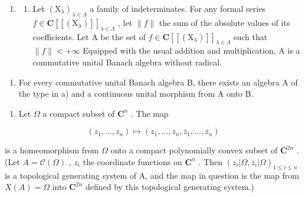 \begin{enumerate}
  Let \(\Delta\) the disk \(|z| \leqslant 1\) into \(\mathbf{C}\) the set of \(f \in \mathcal{C}(\Delta)\) that are holomorphic in the interior of \(\Delta\) and \(\mathrm{A}_1\) the Banach subalgebra of \(\mathcal{C}(\Delta)\) generated by A and by the function \(z \mapsto |z|\) . Show that \(\mathrm{X}(\mathrm{A}_1)\) is homeomorphic to the set of \((x_{1}, x_{2}, x_{3}) \in \mathbf{R}^{3}\) such that \(x_{1}^{2} + x_{2}^{2} \leqslant x_{3}^{2}\) and \(0 \leqslant x_{3} \leqslant 1\) .
\item
  \begin{enumerate}
  \def\labelenumii{\alph{enumii})}
  \tightlist
  \item
    Let \((\mathrm{X}_{\lambda})_{\lambda\in\Lambda}\) a family of indeterminates. For any formal series \(f\in\mathbf{C}[[(\mathrm{X}_{\lambda})]]_{\lambda\in\Lambda}\) , let \(\|f\|\) the sum of the absolute values of its coefficients. Let A be the set of \(f\in\mathbf{C}[[(\mathrm{X}_{\lambda})]]_{\lambda\in\Lambda}\) such that \(\|f\|<+\infty\) Equipped with the usual addition and multiplication, A is a commutative unital Banach algebra without radical.
  \end{enumerate}
\end{enumerate}

\begin{enumerate}
\def\labelenumi{\alph{enumi})}
\setcounter{enumi}{1}
\tightlist
\item
  For every commutative unital Banach algebra B, there exists an algebra A of the type in a) and a continuous unital morphism from A onto B.
\end{enumerate}

\begin{enumerate}
\def\labelenumi{\arabic{enumi})}
\setcounter{enumi}{21}
\tightlist
\item
  Let \(\Omega\) a compact subset of \(\mathbf{C}^n\) . The map
\end{enumerate}

\[
(z _ {1}, \ldots , z _ {n}) \longmapsto (z _ {1}, \ldots , z _ {n}, \overline {{z}} _ {1}, \ldots , \overline {{z}} _ {n})
\]

is a homeomorphism from \(\Omega\) onto a compact polynomially convex subset of \(\mathbf{C}^{2n}\) . (Let \(A = \mathcal{C}(\Omega)\) , \(z_i\) the coordinate functions on \(\mathbf{C}^n\) . Then \((z_i|\Omega, \overline{z}_i|\Omega)_{1 \leqslant i \leqslant n}\) is a topological generating system of A, and the map in question is the map from \(X(A) = \Omega\) into \(\mathbf{C}^{2n}\) defined by this topological generating system.)

